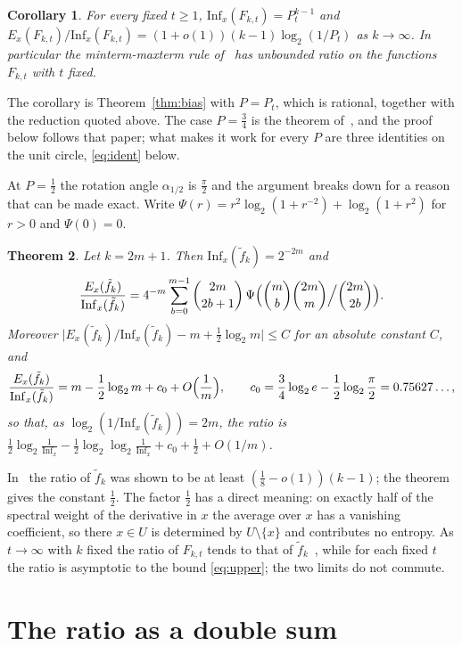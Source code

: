 \documentclass[11pt]{amsart}
\newtheorem{theorem}{Theorem}
\newtheorem{corollary}[theorem]{Corollary}
\theoremstyle{remark}
\newcommand{\Inf}{\mathrm{Inf}}
\begin{document}
\begin{corollary}\label{cor:t}
For every fixed $t\ge1$, $\Inf_x(F_{k,t})=P_t^{k-1}$ and $E_x(F_{k,t})/\Inf_x(F_{k,t})=(1+o(1))(k-1)\log_2(1/P_t)$ as
$k\to\infty$. In particular the minterm-maxterm rule of~\cite{Shm8} has unbounded ratio on the functions $F_{k,t}$
with $t$ fixed.
\end{corollary}

The corollary is Theorem~\ref{thm:bias} with $P=P_t$, which is rational, together with the reduction quoted above.
The case $P=\frac34$ is the theorem of~\cite{Shm9}, and the proof below follows that paper; what makes it work for
every $P$ are three identities on the unit circle, \eqref{eq:ident} below.

At $P=\frac12$ the rotation angle $\alpha_{1/2}$ is $\frac\pi2$ and the argument breaks down for a reason that can be
made exact. Write $\Psi(r)=r^2\log_2(1+r^{-2})+\log_2(1+r^2)$ for $r>0$ and $\Psi(0)=0$.

\begin{theorem}\label{thm:half}
Let $k=2m+1$. Then $\Inf_x(\tilde f_k)=2^{-2m}$ and
\[
\frac{E_x(\tilde f_k)}{\Inf_x(\tilde f_k)}=4^{-m}\sum_{b=0}^{m-1}\binom{2m}{2b+1}\,
\Psi\Bigl(\binom mb\binom{2m}m\Big/\binom{2m}{2b}\Bigr).
\]
Moreover $\bigl|E_x(\tilde f_k)/\Inf_x(\tilde f_k)-m+\frac12\log_2m\bigr|\le C$ for an absolute constant $C$, and
\[
\frac{E_x(\tilde f_k)}{\Inf_x(\tilde f_k)}=m-\frac12\log_2m+c_0+O\Bigl(\frac1m\Bigr),\qquad
c_0=\frac34\log_2e-\frac12\log_2\frac\pi2=0.75627\dots,
\]
so that, as $\log_2(1/\Inf_x(\tilde f_k))=2m$, the ratio is $\frac12\log_2\frac1{\Inf_x}-\frac12\log_2\log_2\frac1{\Inf_x}+c_0+\frac12+O(1/m)$.
\end{theorem}

In~\cite[Proposition~11]{Shm8} the ratio of $\tilde f_k$ was shown to be at least $(\frac18-o(1))(k-1)$; the
theorem gives the constant $\frac12$. The factor $\frac12$ has a direct meaning: on exactly half of the spectral weight
of the derivative in $x$ the average over $x$ has a vanishing coefficient, so there $x\in U$ is determined by
$U\setminus\{x\}$ and contributes no entropy. As $t\to\infty$ with $k$ fixed the ratio of $F_{k,t}$ tends to that of
$\tilde f_k$~\cite[Proposition~12]{Shm8}, while for each fixed $t$ the ratio is asymptotic to the bound
\eqref{eq:upper}; the two limits do not commute.

\section{The ratio as a double sum}\label{sec:sum}
\end{document}
